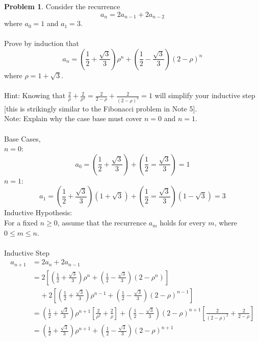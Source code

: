 \documentclass[10pt,leqno ]{article}
\theoremstyle{definition}
\newtheorem{problem}[theorem]{Problem}
\begin{document}
\begin{problem} 
Consider the recurrence
$$a_n = 2a_{n-1}+ 2a_{n-2}$$
where $a_0= 1$ and $a_1= 3$.
\\\\
Prove by induction that
$$a_n = \left(\frac{1}{2}+\frac{\sqrt{3}}{3} \right) \rho^n + \left( \frac{1}{2}-\frac{\sqrt{3}}{3} \right) \left(2- \rho \right)^n$$
where $\rho = 1 + \sqrt{3}$.
\\\\
Hint:  Knowing that $\frac{2}{\rho}+\frac{2}{\rho^2}= \frac{2}{2 - \rho}+\frac{2}{(2 - \rho)^2} = 1$ will simplify your inductive step [this is  strikingly similar to the Fibonacci problem in Note 5].
\\
Note:  Explain why the case base must cover $n= 0$ and $n= 1$.
\Large
\\\\
Base Cases,\\
$n = 0$:
$$a_0 = \left( \frac{1}{2} + \frac{\sqrt{3}}{3} \right) + \left( \frac{1}{2} = \frac{\sqrt{3}}{3} \right) = 1$$
$n = 1$:
$$a_1 = \left( \frac{1}{2} + \frac{\sqrt{3}}{3} \right) (1 + \sqrt{3}) + \left( \frac{1}{2} = \frac{\sqrt{3}}{3} \right) (1 - \sqrt{3}) = 3$$
Inductive Hypothesis:\\
For a fixed $n \geq 0$, assume that the recurrence $a_m$ holds for every $m$, where $0 \leq m \leq n$.\\\\
Inductive Step
\begin{align*}
a_{n+1} &= 2a_n + 2a_{n-1} \\
                            &= 2 \left[ 
                                    \left( \frac{1}{2} + \frac{\sqrt{3}}{3}\right)\rho^n
                                    + \left( \frac{1}{2} - \frac{\sqrt{3}}{3}\right)(2-\rho^n)
                                \right]\\
                            & \;\;\;\; + 2 \left[ 
                                \left( \frac{1}{2} + \frac{\sqrt{3}}{3}\right)\rho^{n-1}
                                + \left( \frac{1}{2} - \frac{\sqrt{3}}{3}\right)(2-\rho)^{n-1}
                                \right]\\
                        &= \left( \frac{1}{2} + \frac{\sqrt{3}}{3}\right)\rho^{n+1} \left[  \frac{2}{\rho^2} + \frac{2}{\rho}\right] 
                            + \left( \frac{1}{2} - \frac{\sqrt{3}}{3}\right) (2-\rho)^{n+1} \left[  \frac{2}{(2-\rho)^2} + \frac{2}{2-\rho}\right]\\
                        &= \left( \frac{1}{2} + \frac{\sqrt{3}}{3}\right)\rho^{n+1}
                            + \left( \frac{1}{2} - \frac{\sqrt{3}}{3}\right) (2-\rho)^{n+1} \\
\end{align*}
\end{problem}
\newpage
\end{document}
